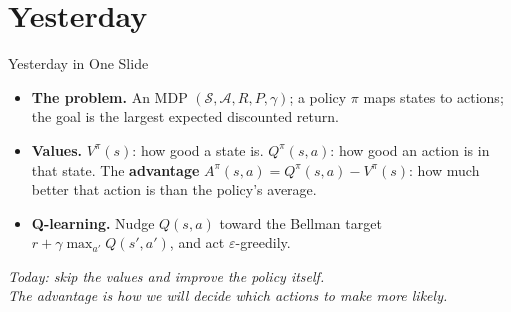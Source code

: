 \section{Yesterday}
\begin{frame}{Yesterday in One Slide}
\begin{itemize}\itemsep0.7em
    \item \textbf{The problem.} An MDP $(\mathcal{S}, \mathcal{A}, R, P, \gamma)$; a policy
          $\pi$ maps states to actions; the goal is the largest expected discounted return.
    \item \textbf{Values.} $V^{\pi}(s)$: how good a state is. $Q^{\pi}(s,a)$: how good an
          action is in that state. The \textbf{advantage}
          $A^{\pi}(s,a) = Q^{\pi}(s,a) - V^{\pi}(s)$: how much better that action is than
          the policy's average.
    \item \textbf{Q-learning.} Nudge $Q(s,a)$ toward the Bellman target
          $r + \gamma \max_{a'} Q(s',a')$, and act $\varepsilon$-greedily.
\end{itemize}
\vfill
\begin{center}
\itshape Today: skip the values and improve the policy itself.\\
The advantage is how we will decide which actions to make more likely.
\end{center}
\end{frame}
